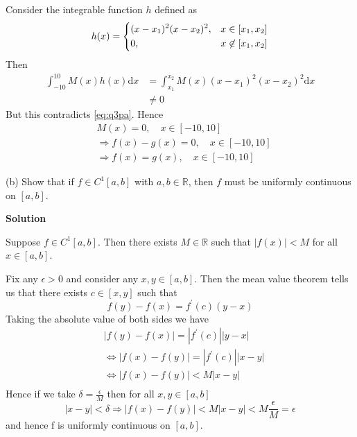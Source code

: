 \documentclass{article}
\begin{document}
Consider the integrable function $h$ defined as
%
\begin{equation*}
    h(x) =
        \begin{dcases}
            (x - x_1)^2 (x - x_2)^2, & x \in [x_1, x_2] \\
            0, & x \not\in [x_1, x_2]
        \end{dcases}
\end{equation*}
%
Then
%
\begin{align*}
    \int_{-10}^{10} M(x) h(x) \mathrm{d} x
        &= \int_{x_1}^{x_2} M(x) (x - x_1)^2 (x - x_2)^2 \mathrm{d} x \\
        &\neq 0
\end{align*}
%
But this contradicts \eqref{eq:q3pa}. Hence
%
\begin{align*}
    &M(x) = 0, \quad x \in [-10, 10] \\
    &\Rightarrow f(x) - g(x) = 0, \quad x \in [-10, 10] \\
    &\Rightarrow f(x) = g(x), \quad x \in [-10, 10]
\end{align*}

\vspace{5mm}

(b) Show that if $f \in C^{1}[a, b]$ with $a, b \in \mathbb{R}$, then
$f$ must be uniformly continuous on $[a, b]$.

\textbf{Solution}

Suppose $f \in C^1[a, b]$. Then there exists $M \in \mathbb{R}$ such
that $|f(x)| < M$ for all $x \in [a, b]$.

Fix any $\epsilon > 0$ and consider any $x, y \in [a, b]$. Then the mean
value theorem tells us that there exists $c \in [x, y]$ such that
%
\begin{equation*}
    f(y) - f(x) = f^\prime(c) (y - x)
\end{equation*}
%
Taking the absolute value of both sides we have
%
\begin{align*}
    &|f(y) - f(x)| = |f^\prime(c)| |y - x| \\
    &\iff |f(x) - f(y)| = |f^\prime(c)| |x - y| \\
    &\iff |f(x) - f(y)| < M |x - y| \\
\end{align*}
%
Hence if we take $\delta = \frac{\epsilon}{M}$ then for all $x, y \in [a, b]$
%
\begin{equation*}
    |x - y| < \delta
    \Rightarrow |f(x) - f(y)| < M |x - y| < M \frac{\epsilon}{M} = \epsilon
\end{equation*}
%
and hence f is uniformly continuous on $[a, b]$.
\end{document}

